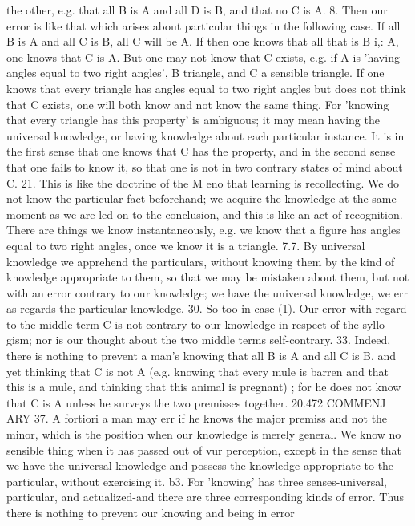 {{{{{{{the other, e.g. that all B is A and all D is B, and that no C is A.
8. Then our error is like that which arises about particular
things in the following case. If all B is A and all C is B, all C will
be A. If then one knows that all that is B i,: A, one knows that
C is A. But one may not know that C exists, e.g. if A is 'having
angles equal to two right angles', B triangle, and C a sensible
triangle. If one knows that every triangle has angles equal to two
right angles but does not think that C exists, one will both know
and not know the same thing. For 'knowing that every triangle
has this property' is ambiguous; it may mean having the universal
knowledge, or having knowledge about each particular instance.
It is in the first sense that one knows that C has the property,
and in the second sense that one fails to know it, so that one is
not in two contrary states of mind about C.
21. This is like the doctrine of the M eno that learning is
recollecting. We do not know the particular fact beforehand; we
acquire the knowledge at the same moment as we are led on to the
conclusion, and this is like an act of recognition. There are things
we know instantaneously, e.g. we know that a figure has angles
equal to two right angles, once we know it is a triangle.
7.7. By universal knowledge we apprehend the particulars,
without knowing them by the kind of knowledge appropriate to
them, so that we may be mistaken about them, but not with an
error contrary to our knowledge; we have the universal knowledge,
we err as regards the particular knowledge.
30. So too in case (1). Our error with regard to the middle
term C is not contrary to our knowledge in respect of the syllo-
gism; nor is our thought about the two middle terms self-contrary.
33. Indeed, there is nothing to prevent a man's knowing that
all B is A and all C is B, and yet thinking that C is not A (e.g.
knowing that every mule is barren and that this is a mule, and
thinking that this animal is pregnant) ; for he does not know that
C is A unless he surveys the two premisses together.
20.472
COMMENJ ARY
37. A fortiori a man may err if he knows the major premiss
and not the minor, which is the position when our knowledge is
merely general. We know no sensible thing when it has passed
out of vur perception, except in the sense that we have the
universal knowledge and possess the knowledge appropriate to the
particular, without exercising it.
b3. For 'knowing' has three senses-universal, particular, and
actualized-and there are three corresponding kinds of error.
Thus there is nothing to prevent our knowing and being in error
}}}}}}}
